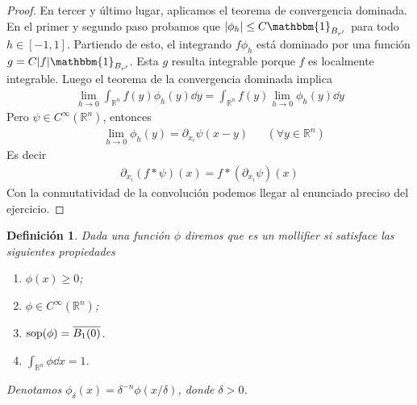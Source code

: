 \documentclass{article}
\newcommand{\characteristic}{\mathbbm{1}}
\newcommand{\realNumbers}{\mathbb{R}}
\newtheorem{definition}{Definición}
\DeclareMathOperator{\support}{\textnormal{sop}}
\theoremstyle{remark}
\begin{document}
\begin{proof}
  En tercer y último lugar, aplicamos el teorema de convergencia dominada.
  En el primer y segundo paso probamos que \(\abs{\phi_h} \leq C \characteristic_{B_{r'}}\) para todo \(h \in [- 1, 1]\).
  Partiendo de esto, el integrando \(f \phi_h\) está dominado por una función \(g = C \abs{f} \characteristic_{B_{r'}}\).
  Esta \(g\) resulta integrable porque \(f\) es localmente integrable.
  Luego el teorema de la convergencia dominada implica
  \begin{align}
    \lim_{h \rightarrow 0}
      \int_{\realNumbers^n} f(y) \phi_h(y) \dd y
    =
    \int_{\realNumbers^n}
      f(y)
      \lim_{h \rightarrow 0} \phi_h(y) \dd y
  \end{align}
  Pero \(\psi \in C^{\infty}(\realNumbers^n)\), entonces
  \begin{align}
    &\lim_{h \rightarrow 0} \phi_h(y) = \partial_{x_i} \psi (x - y)
    && (\forall y \in \realNumbers^n)
  \end{align}
  Es decir
  \begin{align}
    \partial_{x_i} (f * \psi) (x)
    =
    f * (\partial_{x_i} \psi) (x)
  \end{align}
  Con la conmutatividad de la convolución podemos llegar al enunciado preciso del ejercicio.
\end{proof}

\begin{definition}
  Dada una función \(\phi\) diremos que es un mollifier si satisface las siguientes propiedades
  \begin{enumerate}[label=\alph*)]
    \item \(\phi(x) \geq 0\);
    \item \(\phi \in C^{\infty}(\realNumbers^n)\);
    \item \(\support(\phi) = \overline{B_1(0)}\).
    \item \(\int_{\realNumbers^n} \phi \dd x = 1\).
  \end{enumerate}
  Denotamos \(\phi_{\delta}(x) = \delta^{- n} \phi(x / \delta)\), donde \(\delta > 0\).
\end{definition}
\end{document}
